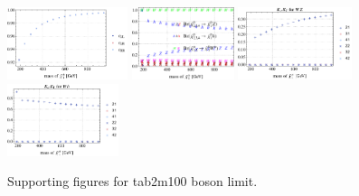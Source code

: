 \documentclass[a4paper,10pt,captions=tableheading,DIV=14]{scrartcl}
\numberwithin{equation}{section}
\begin{document}
\begin{figure}[h!]\centering
 \includegraphics[height=60pt]{../plots/plot_tab2m100boson_cfactors.pdf}
 \includegraphics[height=60pt]{../plots/plot_tab2m100boson_br.pdf}
 \includegraphics[height=60pt]{../plots/plot_tab2m100boson_WZ.pdf}
 \includegraphics[height=60pt]{../plots/plot_tab2m100boson_WH.pdf}
\caption{Supporting figures for tab2m100 boson limit.}
\end{figure}

\clearpage

\end{document}
